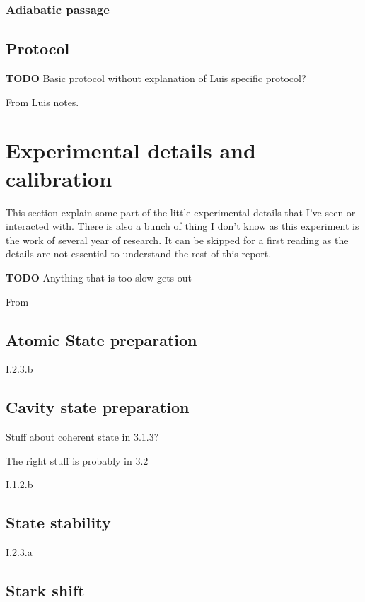 \documentclass[10pt]{report}
\theoremstyle{plain}
\theoremstyle{definition}
\theoremstyle{remark}
\newcommand{\TODO}{\textbf{TODO}}
\begin{document}
\subsubsection{Adiabatic passage}

\subsection{Protocol}


\TODO{} Basic protocol without explanation of Luis specific protocol?

From Luis notes.


\section{Experimental details and calibration}

This section explain some part of the little experimental details that I've seen
or interacted with. There is also a bunch of thing I don't know as this
experiment is the work of several year of research. It can be skipped for a
first reading as the details are not essential to understand the rest of this report.

\TODO{} Anything that is too slow gets out

From~\cite{SayPHD11}


\subsection{Atomic State preparation}

I.2.3.b



\subsection{Cavity state preparation}

Stuff about coherent state in 3.1.3?

The right stuff is probably in 3.2

I.1.2.b

\subsection{State stability}\label{ssec:ststab}

I.2.3.a

\subsection{Stark shift}
\end{document}
